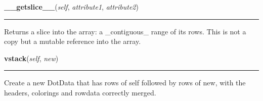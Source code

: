     \label{Classes:DotData:DotData:__getslice__}

    \vspace{0.5ex}

\hspace{.8\funcindent}\begin{boxedminipage}{\funcwidth}

    \raggedright \textbf{\_\_getslice\_\_}(\textit{self}, \textit{attribute1}, \textit{attribute2})

    \vspace{-1.5ex}

    \rule{\textwidth}{0.5\fboxrule}
\setlength{\parskip}{2ex}
    Returns a slice into the array: a \_contiguous\_ range of its rows. 
    This is not a copy but a mutable reference into the array.

\setlength{\parskip}{1ex}
    \end{boxedminipage}

    \label{Classes:DotData:DotData:vstack}

    \vspace{0.5ex}

\hspace{.8\funcindent}\begin{boxedminipage}{\funcwidth}

    \raggedright \textbf{vstack}(\textit{self}, \textit{new})

    \vspace{-1.5ex}

    \rule{\textwidth}{0.5\fboxrule}
\setlength{\parskip}{2ex}
    Create a new DotData that has rows of self followed by rows of new, 
    with the headers, colorings and rowdata correctly merged.

\setlength{\parskip}{1ex}
    \end{boxedminipage}

    \label{Classes:DotData:DotData:hstack}

    \vspace{0.5ex}

